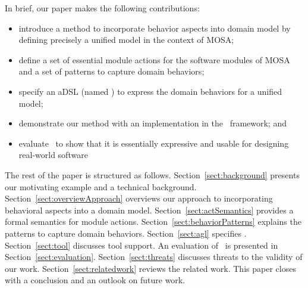 In brief, our paper makes the following contributions:
%
\begin{itemize}[leftmargin=*]
	\item introduce a method to incorporate behavior aspects into domain model by defining precisely a unified model in the context of MOSA;
	\item define a set of essential module actions for the software modules of MOSA and a set of patterns to capture domain behaviors;
	\item specify an aDSL (named \agl) to express the domain behaviors for a unified model;
	\item demonstrate our method with an implementation in the \jdomainapp~framework; and
  \item evaluate \agl~to show that it is essentially expressive and usable for designing real-world software
\end{itemize}

The rest of the paper is structured as follows. Section~\ref{sect:background} presents our motivating example and a technical background. 
Section~\ref{sect:overviewApproach} overviews our approach to incorporating behavioral aspects into a domain model. 
Section~\ref{sect:actSemantics} provides a formal semantics for module actions. Section~\ref{sect:behaviorPatterns} explains the patterns to capture domain behaviors.  
Section~\ref{sect:agl} specifies \agl. 
Section~\ref{sect:tool} discusses tool support.
An evaluation of \agl~is presented in Section~\ref{sect:evaluation}. Section~\ref{sect:threats} discusses threats to the validity of our work.
Section~\ref{sect:relatedwork} reviews the related work. This paper closes with a conclusion and an outlook on future work.
